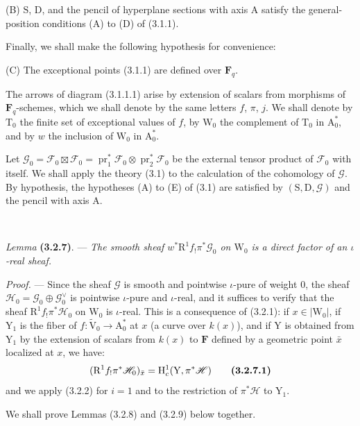 \documentclass[11pt,leqno]{article}
\newcommand{\Page}[1]{\ifvmode\noindent\else\unskip\ \fi{\footnotesize\textcolor{gray}{[p.\,#1]}}\ \ignorespaces}
\begin{document}
(B) \(\mathrm{S}\), \(\mathrm{D}\), and the pencil of hyperplane sections with axis \(\mathrm{A}\) satisfy the general-position conditions (A) to (D) of (3.1.1).

Finally, we shall make the following hypothesis for convenience:

(C) The exceptional points (3.1.1) are defined over \(\mathbf{F}_q\).

The arrows of diagram (3.1.1.1) arise by extension of scalars from morphisms of \(\mathbf{F}_q\)-schemes, which we shall denote by the same letters \(f\), \(\pi\), \(j\). We shall denote by \(\mathrm{T}_0\) the finite set of exceptional values of \(f\), by \(\mathrm{W}_0\) the complement of \(\mathrm{T}_0\) in \(\mathrm{A}_0^*\), and by \(w\) the inclusion of \(\mathrm{W}_0\) in \(\mathrm{A}_0^*\).

Let \(\mathscr{G}_0=\mathscr{F}_0\boxtimes\mathscr{F}_0=\operatorname{pr}_1^*\mathscr{F}_0\otimes\operatorname{pr}_2^*\mathscr{F}_0\) be the external tensor product of \(\mathscr{F}_0\) with itself. We shall apply the theory (3.1) to the calculation of the cohomology of \(\mathscr{G}\). By hypothesis, the hypotheses (A) to (E) of (3.1) are satisfied by \((\mathrm{S},\mathrm{D},\mathscr{G})\) and the pencil with axis \(\mathrm{A}\).

\Page{202}

\textit{Lemma} \textbf{(3.2.7)}. — \textit{The smooth sheaf \(w^*\mathrm{R}^1f_!\pi^*\mathscr{G}_0\) on \(\mathrm{W}_0\) is a direct factor of an \(\iota\)-real sheaf.}

\textit{Proof.} — Since the sheaf \(\mathscr{G}\) is smooth and pointwise \(\iota\)-pure of weight \(0\), the sheaf \(\mathscr{H}_0=\mathscr{G}_0\oplus\mathscr{G}_0^\vee\) is pointwise \(\iota\)-pure and \(\iota\)-real, and it suffices to verify that the sheaf \(\mathrm{R}^1f_!\pi^*\mathscr{H}_0\) on \(\mathrm{W}_0\) is \(\iota\)-real. This is a consequence of (3.2.1): if \(x\in|\mathrm{W}_0|\), if \(\mathrm{Y}_1\) is the fiber of  \(f:\widetilde{\mathrm{V}}_0\to\mathrm{A}_0^*\) at \(x\) (a curve over \(k(x)\)), and if \(\mathrm{Y}\) is obtained from \(\mathrm{Y}_1\) by the extension of scalars from \(k(x)\) to \(\mathbf{F}\) defined by a geometric point \(\bar{x}\) localized at \(x\), we have:
\[
(\mathrm{R}^1f_!\pi^*\mathscr{H}_0)_{\bar{x}}
=\mathrm{H}_c^1(\mathrm{Y},\pi^*\mathscr{H})
\tag*{\textbf{(3.2.7.1)}}
\]
and we apply (3.2.2) for \(i=1\) and to the restriction of \(\pi^*\mathscr{H}\) to \(\mathrm{Y}_1\).

We shall prove Lemmas (3.2.8) and (3.2.9) below together.
\end{document}

